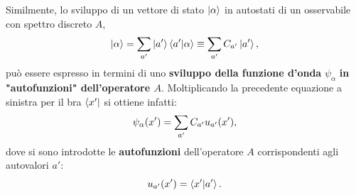 Similmente, lo sviluppo di un vettore di stato $\ket{\alpha}$ in autostati di un osservabile con spettro discreto $A$,
\begin{equation}
  \ket{\alpha} = \sum_{a'}\ket{a'}\braket{a'}{\alpha}\equiv \sum_{a'}C_{a'}\ket{a'} ,
\end{equation}
può essere espresso in termini di uno \textbf{sviluppo della funzione d'onda} $\psi_{\alpha}$ \textbf{in "autofunzioni" dell'operatore $A$}.
Moltiplicando la precedente equazione a sinistra per il bra $\bra{x'}$ si ottiene infatti:
\begin{equation}
  \psi_{\alpha}\qty(x') = \sum_{a'}C_{a'}u_{a'}\qty(x') ,
\end{equation}
dove si sono introdotte le \textbf{autofunzioni} dell'operatore $A$ corrispondenti agli autovalori $a'$:
\begin{equation}
  u_{a'}\qty(x') = \braket{x'}{a'} .
\end{equation}
